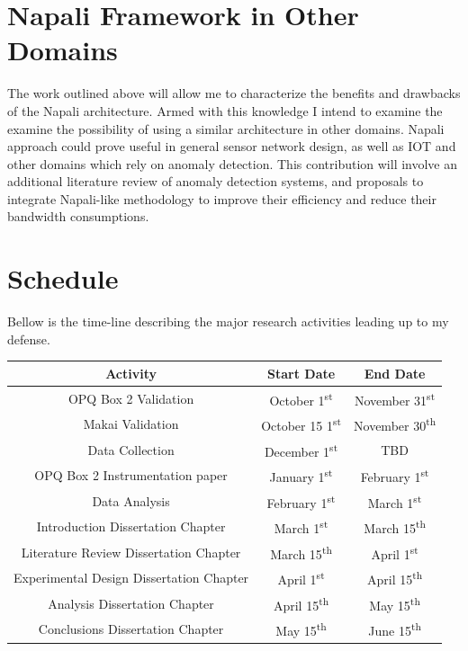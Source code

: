 \section{Napali Framework in Other Domains}
The work outlined above will allow me to characterize the benefits and drawbacks of the Napali architecture. Armed with this knowledge I intend to examine the examine the possibility of using a similar architecture in other domains. Napali approach could prove useful in general sensor network design, as well as IOT and other domains which rely on anomaly detection. This contribution will involve an additional literature review of anomaly detection systems, and proposals to integrate Napali-like methodology to improve their efficiency and reduce their bandwidth consumptions.


\section{Schedule}
Bellow is the time-line describing the major research activities leading up to my defense.

\begin{center}
\begin{tabular}{ ||c | c c|| }
\hline
 \textbf{Activity} & \textbf{Start Date} & \textbf{End Date} \\ 
 \hline
 \hline
 OPQ Box 2 Validation & October 1\textsuperscript{st} & November 31\textsuperscript{st} \\  
 Makai Validation & October 15 1\textsuperscript{st} & November 30\textsuperscript{th}   \\
 Data Collection & December 1\textsuperscript{st} & TBD   \\
 OPQ Box 2 Instrumentation paper & January 1\textsuperscript{st} & February 1\textsuperscript{st}   \\
 Data Analysis & February 1\textsuperscript{st} & March 1\textsuperscript{st}  \\
 Introduction Dissertation Chapter & March 1\textsuperscript{st}  & March 15\textsuperscript{th}  \\
 Literature Review Dissertation Chapter & March 15\textsuperscript{th} & April 1\textsuperscript{st}  \\
 Experimental Design Dissertation Chapter & April 1\textsuperscript{st} & April 15\textsuperscript{th}  \\
 Analysis Dissertation Chapter & April 15\textsuperscript{th} & May 15\textsuperscript{th}  \\
 Conclusions Dissertation Chapter & May 15\textsuperscript{th} & June 15\textsuperscript{th}  \\
 \hline
 
\end{tabular}
\end{center}
